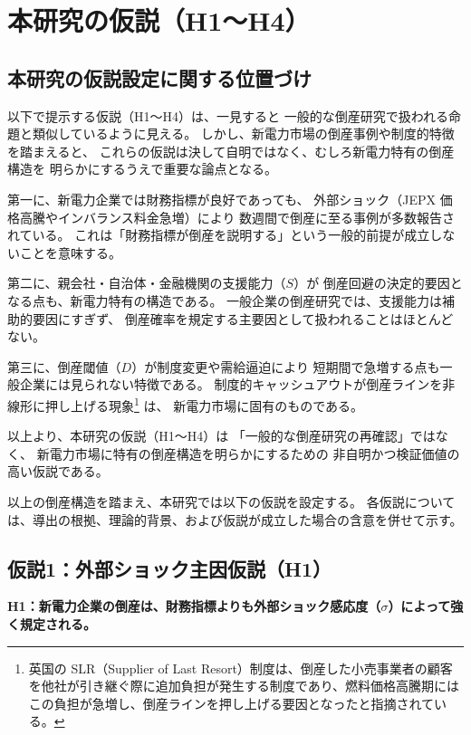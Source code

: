 
\section{本研究の仮説（H1〜H4）}

\subsection*{本研究の仮説設定に関する位置づけ}

以下で提示する仮説（H1〜H4）は、一見すると
一般的な倒産研究で扱われる命題と類似しているように見える。
しかし、新電力市場の倒産事例や制度的特徴を踏まえると、
これらの仮説は決して自明ではなく、むしろ新電力特有の倒産構造を
明らかにするうえで重要な論点となる。


第一に、新電力企業では財務指標が良好であっても、
外部ショック（JEPX 価格高騰やインバランス料金急増）により
数週間で倒産に至る事例が多数報告されている。
これは「財務指標が倒産を説明する」という一般的前提が成立しないことを意味する。

第二に、親会社・自治体・金融機関の支援能力（$S$）が
倒産回避の決定的要因となる点も、新電力特有の構造である。
一般企業の倒産研究では、支援能力は補助的要因にすぎず、
倒産確率を規定する主要因として扱われることはほとんどない。

第三に、倒産閾値（$D$）が制度変更や需給逼迫により
短期間で急増する点も一般企業には見られない特徴である。
制度的キャッシュアウトが倒産ラインを非線形に押し上げる現象\footnote{英国の SLR（Supplier of Last Resort）制度は、倒産した小売事業者の顧客を他社が引き継ぐ際に追加負担が発生する制度であり、燃料価格高騰期にはこの負担が急増し、倒産ラインを押し上げる要因となったと指摘されている。}
は、
新電力市場に固有のものである。

以上より、本研究の仮説（H1〜H4）は
「一般的な倒産研究の再確認」ではなく、
新電力市場に特有の倒産構造を明らかにするための
非自明かつ検証価値の高い仮説である。


以上の倒産構造を踏まえ、本研究では以下の仮説を設定する。
各仮説については、導出の根拠、理論的背景、および仮説が成立した場合の含意を併せて示す。

\subsection*{仮説1：外部ショック主因仮説（H1）}

\textbf{H1：新電力企業の倒産は、財務指標よりも外部ショック感応度（$\sigma$）によって強く規定される。}

